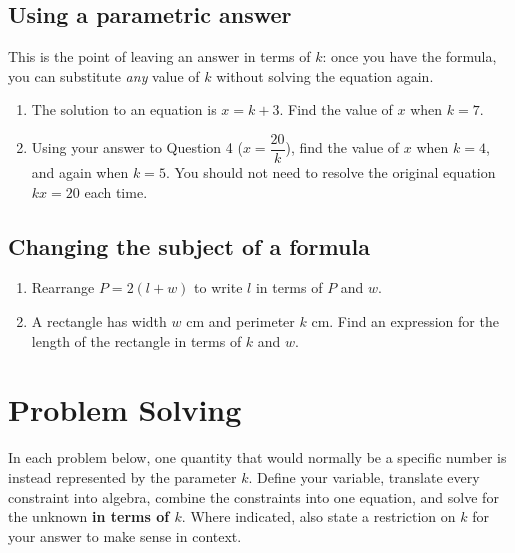 \documentclass[11pt]{article}
\newcommand{\qspace}{\vspace{1.0cm}}
\begin{document}
\subsection*{Using a parametric answer}
This is the point of leaving an answer in terms of $k$: once you have the formula, you can substitute \emph{any} value of $k$ without solving the equation again.

\begin{enumerate}[resume]
  \item The solution to an equation is $x = k + 3$. Find the value of $x$ when $k = 7$.
  \qspace
  \item Using your answer to Question 4 ($x = \dfrac{20}{k}$), find the value of $x$ when $k = 4$, and again when $k = 5$. You should not need to resolve the original equation $kx=20$ each time.
  \qspace
\end{enumerate}

\subsection*{Changing the subject of a formula}
\begin{enumerate}[resume]
  \item Rearrange $P = 2(l + w)$ to write $l$ in terms of $P$ and $w$.
  \qspace
  \item A rectangle has width $w$ cm and perimeter $k$ cm. Find an expression for the length of the rectangle in terms of $k$ and $w$.
  \qspace
\end{enumerate}

\newpage
\section{Problem Solving}

\noindent In each problem below, one quantity that would normally be a specific number is instead represented by the parameter $k$. Define your variable, translate every constraint into algebra, combine the constraints into one equation, and solve for the unknown \textbf{in terms of $k$}. Where indicated, also state a restriction on $k$ for your answer to make sense in context.
\end{document}
